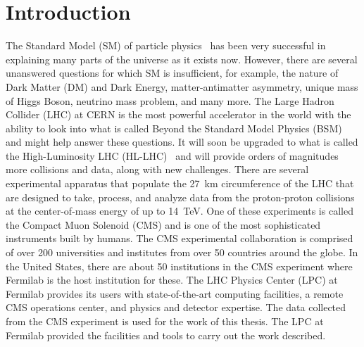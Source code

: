 \chapter{Introduction}

The Standard Model (SM) of particle physics~\cite{What_is_SM} has been very successful in explaining many parts of the universe as it exists now. However, there are several unanswered questions for which SM is insufficient, for example, the nature of Dark Matter (DM) and Dark Energy, matter-antimatter asymmetry, unique mass of Higgs Boson, neutrino mass problem, and many more. The Large Hadron Collider (LHC) \cite{What_is_LHC} at CERN\cite{What_is_CERN} is the most powerful accelerator in the world with the ability to look into what is called Beyond the Standard Model Physics (BSM) and might help answer these questions. It will soon be upgraded to what is called the High-Luminosity LHC (HL-LHC)~\cite{hl-lhc} and will provide orders of magnitudes more collisions and data, along with new challenges. There are several experimental apparatus that populate the 27~\unit{km} circumference of the LHC that are designed to take, process, and analyze data from the proton-proton collisions at the center-of-mass energy of up to 14~\unit{TeV}.
One of these experiments is called the Compact Muon Solenoid (CMS) \cite{What_is_CMS,CMS_detector} and is one of the most sophisticated instruments built by humans. The CMS experimental collaboration is comprised of over 200 universities and institutes from over 50 countries around the globe. In the United States, there are about 50 institutions in the CMS experiment where Fermilab is the host institution for these. The LHC Physics Center (LPC) at Fermilab provides its users with state-of-the-art computing facilities, a remote CMS operations center, and physics and detector expertise.
The data collected from the CMS experiment is used for the work of this thesis. The LPC at Fermilab provided the facilities and tools to carry out the work described.

